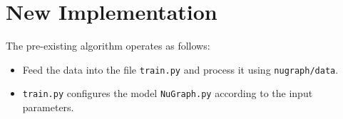 \section{New Implementation}

The pre-existing algorithm operates as follows:

\begin{itemize}
    \item Feed the data into the file \texttt{train.py} and process it using \texttt{nugraph/data}.
    \item \texttt{train.py} configures the model \texttt{NuGraph.py} according to the input parameters.
\end{itemize}